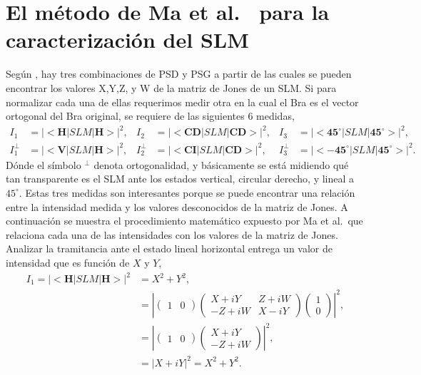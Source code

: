 \section{El método de Ma et al.~ para la caracterización del SLM}
\label{sec:metodo_ma}
Según , hay tres combinaciones de PSD y PSG a partir
de las cuales se pueden encontrar los valores X,Y,Z, y W de la matriz
de Jones de un SLM. Si para
normalizar cada una de ellas requerimos medir otra en la cual el Bra
es el vector ortogonal del Bra original, se requiere de las siguientes
6 medidas, 
\begin{align*}
I_1 &= |<\mathbf{H}|SLM|\mathbf{H}>|^2,& I_2 &= |<\mathbf{CD}|SLM|\mathbf{CD}>|^2,&I_3
  &= |<\mathbf{45^{\circ}}|SLM|\mathbf{45^{\circ}}>|^2,\\
I_1^{\perp} &= |<\mathbf{V}|SLM|\mathbf{H}>|^2,&I_2^{\perp} &= |<\mathbf{CI}|SLM|\mathbf{CD}>|^2,&I_{3}^{\perp} &= |<\mathbf{-45^{\circ}}|SLM|\mathbf{45^{\circ}}>|^2.
\end{align*}
Dónde el símbolo $^{\perp}$ denota ortogonalidad, y básicamente se
está midiendo qué tan transparente es el SLM ante 
los estados vertical, circular derecho, y lineal a $45^{\circ}$. 
Estas tres medidas son interesantes porque se puede encontrar una
relación entre la intensidad medida 
y los valores desconocidos de la matriz de Jones. 
A continuación se muestra el procedimiento matemático expuesto por Ma
et al.~que relaciona cada una de las intensidades con los valores de
la matriz de Jones. 
Analizar la tramitancia ante el estado lineal horizontal entrega un valor
de intensidad que es función de $X$ y $Y$,
\begin{align*}
I_1 = |<\mathbf{H}|SLM|\mathbf{H}>|^2 &= X^2+Y^2,\\
&=  \left|\begin{pmatrix} 1&0\end{pmatrix} 
       \begin{pmatrix}
         X+iY & Z+iW \\-Z+iW & X-iY
       \end{pmatrix} \begin{pmatrix}1\\0\end{pmatrix}\right|^2, \\
&=  \left|\begin{pmatrix} 1&0\end{pmatrix} 
       \begin{pmatrix} X+iY \\-Z+iW \end{pmatrix} \right|^2, \\
&=  \left|X+iY\right|^2 =  X^2+Y^2.\\
\end{align*}
